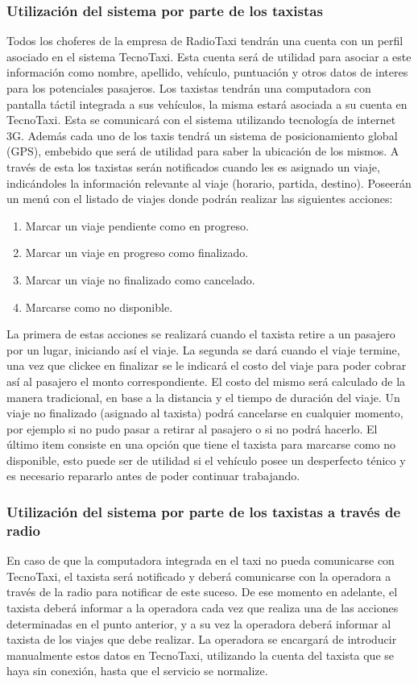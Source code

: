 	\subsubsection{Utilización del sistema por parte de los taxistas}
	Todos los choferes de la empresa de RadioTaxi tendrán una cuenta con un perfil asociado en el sistema TecnoTaxi. Esta cuenta será de utilidad para asociar a este información como nombre, apellido, vehículo, puntuación y otros datos de interes para los potenciales pasajeros. Los taxistas tendrán una computadora con pantalla táctil integrada a sus vehículos, la misma estará asociada a su cuenta en TecnoTaxi. Esta se comunicará con el sistema utilizando tecnología de internet 3G. Además cada uno de los taxis tendrá un sistema de posicionamiento global (GPS), embebido que será de utilidad para saber la ubicación de los mismos. A través de esta los taxistas serán notificados cuando les es asignado un viaje, indicándoles la información relevante al viaje (horario, partida, destino). Poseerán un menú con el listado de viajes donde podrán realizar las siguientes acciones:
	\begin{enumerate}
	\item Marcar un viaje pendiente como en progreso.
	\item Marcar un viaje en progreso como finalizado.
	\item Marcar un viaje no finalizado como cancelado.
	\item Marcarse como no disponible.
	\end{enumerate}
	La primera de estas acciones se realizará cuando el taxista retire a un pasajero por un lugar, iniciando así el viaje. La segunda se dará cuando el viaje termine, una vez que clickee en finalizar se le indicará el costo del viaje para poder cobrar así al pasajero el monto correspondiente. El costo del mismo será calculado de la manera tradicional, en base a la distancia y el tiempo de duración del viaje. Un viaje no finalizado (asignado al taxista) podrá cancelarse en cualquier momento, por ejemplo si no pudo pasar a retirar al pasajero o si no podrá hacerlo. El último item consiste en una opción que tiene el taxista para marcarse como no disponible, esto puede ser de utilidad si el vehículo posee un desperfecto ténico y es necesario repararlo antes de poder continuar trabajando.

	\subsubsection{Utilización del sistema por parte de los taxistas a través de radio}
	En caso de que la computadora integrada en el taxi no pueda comunicarse con TecnoTaxi, el taxista será notificado y deberá comunicarse con la operadora a través de la radio para notificar de este suceso. De ese momento en adelante, el taxista deberá informar a la operadora cada vez que realiza una de las acciones determinadas en el punto anterior, y a su vez la operadora deberá informar al taxista de los viajes que debe realizar. La operadora se encargará de introducir manualmente estos datos en TecnoTaxi, utilizando la cuenta del taxista que se haya sin conexión, hasta que el servicio se normalize.

